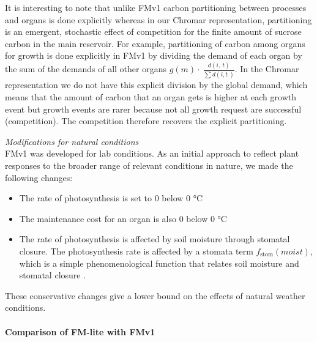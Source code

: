 \documentclass[phd]{infthesis}
\begin{document}
It is interesting to note that unlike FMv1 carbon partitioning between
processes and organs is done explicitly whereas in our Chromar
representation, partitioning is an emergent, stochastic effect of
competition for the finite amount of sucrose carbon in the main
reservoir. For example, partitioning of carbon among organs for growth
is done explicitly in FMv1 by dividing the demand of each organ by the
sum of the demands of all other organs
\(g\left( m \right) \cdot \ \frac{d(i,\ t)}{\sum_{}^{}{d(i,t\ )}}\). In
the Chromar representation we do not have this explicit division by the
global demand, which means that the amount of carbon that an organ gets
is higher at each growth event but growth events are rarer because not
all growth request are successful (competition). The competition
therefore recovers the explicit partitioning.

\emph{Modifications for natural conditions}\\
FMv1 was developed for lab conditions. As an initial approach to reflect
plant responses to the broader range of relevant conditions in nature,
we made the following changes:

\begin{itemize}
\item
  The rate of photosynthesis is set to 0 below 0 °C
\item
  The maintenance cost for an organ is also 0 below 0 °C
\item
  The rate of photosynthesis is affected by soil moisture through
  stomatal closure. The photosynthesis rate is affected by a stomata
  term \(f_{\text{stom}}(moist)\), which is a simple phenomenological
  function that relates soil moisture and stomatal closure \citep{france_mathematical_1984}.
\end{itemize}

These conservative changes give a lower bound on the effects of natural
weather conditions.

\paragraph{Comparison of FM-lite with
  FMv1}
\label{comparison-of-fm-lite-with-fmv1}
\end{document}
